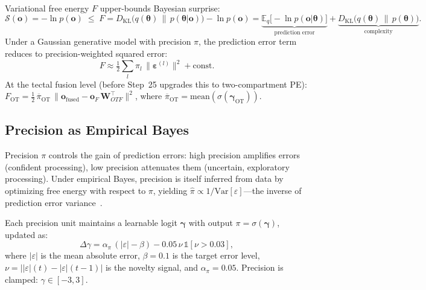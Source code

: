 \documentclass[11pt,a4paper]{article}
\begin{document}
Variational free energy $F$ upper-bounds Bayesian surprise:
\begin{equation}\label{eq:surprise_bound}
  \mathcal{S}(\mathbf{o}) = -\ln p(\mathbf{o}) \;\leq\; F
    = D_\text{KL}\!\bigl(q(\boldsymbol{\theta})\,\|\,p(\boldsymbol{\theta}|\mathbf{o})\bigr)
    - \ln p(\mathbf{o})
    = \underbrace{\mathbb{E}_q\bigl[-\ln p(\mathbf{o}|\boldsymbol{\theta})\bigr]}_{\text{prediction error}}
    + \underbrace{D_\text{KL}\!\bigl(q(\boldsymbol{\theta})\,\|\,p(\boldsymbol{\theta})\bigr)}_{\text{complexity}}.
\end{equation}
Under a Gaussian generative model with precision $\pi$, the prediction error
term reduces to precision-weighted squared error:
\begin{equation}\label{eq:freeenergy}
  F \approx \tfrac{1}{2}\sum_l \pi_l\,
      \bigl\|\boldsymbol{\varepsilon}^{(l)}\bigr\|^2
    + \text{const.}
\end{equation}
At the tectal fusion level (before Step~25 upgrades this to two-compartment PE):
$F_\text{OT} = \tfrac{1}{2}\,\overline{\pi}_\text{OT}\,
\|\mathbf{o}_\text{fused} - \mathbf{o}_F\,\mathbf{W}_{OTF}^\top\|^2$,
where $\overline{\pi}_\text{OT} = \text{mean}(\sigma(\boldsymbol{\gamma}_\text{OT}))$.

\subsection{Precision as Empirical Bayes}

Precision $\pi$ controls the gain of prediction errors: high precision
amplifies errors (confident processing), low precision attenuates them
(uncertain, exploratory processing).
Under empirical Bayes, precision is itself inferred from data by
optimizing free energy with respect to $\pi$, yielding
$\hat{\pi} \propto 1/\text{Var}[\varepsilon]$---the inverse of prediction
error variance~\cite{feldman2010}.

Each precision unit maintains a learnable logit $\boldsymbol{\gamma}$ with
output $\pi = \sigma(\boldsymbol{\gamma})$, updated as:
\begin{equation}\label{eq:precision}
  \Delta\gamma = \alpha_\pi\,(|\varepsilon| - \beta)
    - 0.05\,\nu\,\mathbb{1}[\nu > 0.03],
\end{equation}
where $|\varepsilon|$ is the mean absolute error, $\beta = 0.1$ is the target
error level, $\nu = ||\varepsilon|(t) - |\varepsilon|(t{-}1)|$ is the novelty
signal, and $\alpha_\pi = 0.05$.
Precision is clamped: $\gamma \in [-3, 3]$.
\end{document}
